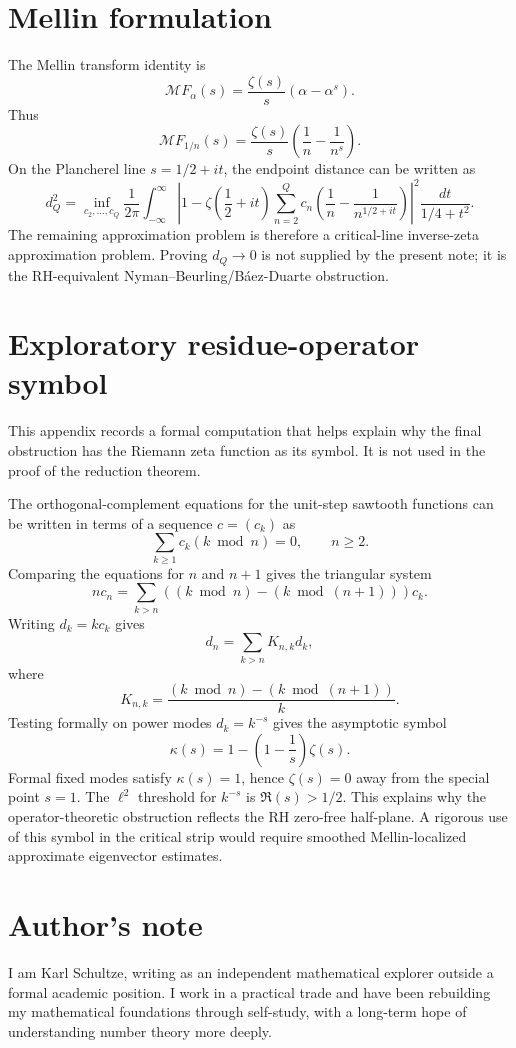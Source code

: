 \documentclass[11pt]{article}
\begin{document}
\section{Mellin formulation}

The Mellin transform identity is
\[
\mathcal M F_\alpha(s)=\frac{\zeta(s)}s(\alpha-\alpha^s).
\]
Thus
\[
\mathcal M F_{1/n}(s)=\frac{\zeta(s)}s\left(\frac1n-\frac1{n^s}\right).
\]
On the Plancherel line $s=1/2+it$, the endpoint distance can be written as
\[
d_Q^2=\inf_{c_2,\dots,c_Q}\frac1{2\pi}\int_{-\infty}^{\infty}\left|1-\zeta\left(\frac12+it\right)\sum_{n=2}^Q c_n\left(\frac1n-\frac1{n^{1/2+it}}\right)\right|^2\frac{dt}{1/4+t^2}.
\]
The remaining approximation problem is therefore a critical-line inverse-zeta approximation problem. Proving $d_Q\to0$ is not supplied by the present note; it is the RH-equivalent Nyman--Beurling/Báez-Duarte obstruction.

\appendix
\section{Exploratory residue-operator symbol}

This appendix records a formal computation that helps explain why the final obstruction has the Riemann zeta function as its symbol. It is not used in the proof of the reduction theorem.

The orthogonal-complement equations for the unit-step sawtooth functions can be written in terms of a sequence $c=(c_k)$ as
\[
\sum_{k\ge1}c_k(k\bmod n)=0,\qquad n\ge2.
\]
Comparing the equations for $n$ and $n+1$ gives the triangular system
\[
nc_n=\sum_{k>n}\left((k\bmod n)-(k\bmod(n+1))\right)c_k.
\]
Writing $d_k=kc_k$ gives
\[
d_n=\sum_{k>n}K_{n,k}d_k,
\]
where
\[
K_{n,k}=\frac{(k\bmod n)-(k\bmod(n+1))}{k}.
\]
Testing formally on power modes $d_k=k^{-s}$ gives the asymptotic symbol
\[
\kappa(s)=1-\left(1-\frac1s\right)\zeta(s).
\]
Formal fixed modes satisfy $\kappa(s)=1$, hence $\zeta(s)=0$ away from the special point $s=1$. The $\ell^2$ threshold for $k^{-s}$ is $\Re(s)>1/2$. This explains why the operator-theoretic obstruction reflects the RH zero-free half-plane. A rigorous use of this symbol in the critical strip would require smoothed Mellin-localized approximate eigenvector estimates.


\section*{Author's note}

I am Karl Schultze, writing as an independent mathematical explorer outside a formal academic position. I work in a practical trade and have been rebuilding my mathematical foundations through self-study, with a long-term hope of understanding number theory more deeply.
\end{document}
